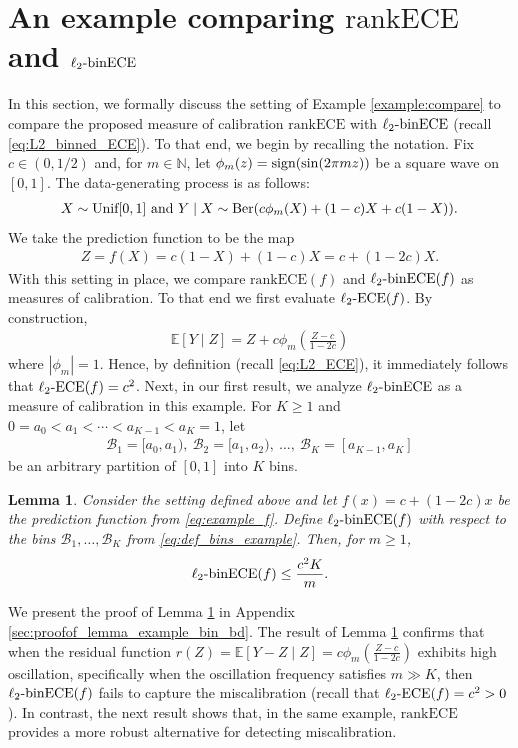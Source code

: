 \documentclass[11pt]{article}
\numberwithin{equation}{section}
\newtheorem{lemma}{Lemma}[section]
\theoremstyle{definition}
\newcommand{\E}{\mathbb{E}}
\newcommand{\N}{\mathbb{N}}
\newcommand{\cB}{\mathcal{B}}
\newcommand{\ECE}{\mathrm{ECE}}
\newcommand{\lECE}{\ell_2\textnormal{-}\ECE}
\newcommand{\binECE}{\mathrm{binECE}}
\newcommand{\lbinECE}{\ell_2\textnormal{-}\binECE}
\newcommand{\rankECE}{\mathrm{rankECE}}
\begin{document}
\section{An example comparing $\rankECE$ and $\lbinECE$}\label{appendix:example}

In this section, we formally discuss the setting of Example \ref{example:compare} to compare the proposed measure of calibration $\rankECE$ with $\lbinECE$ (recall \eqref{eq:L2_binned_ECE}). To that end, we begin by recalling the notation. Fix $c\in (0,1/2)$ and, for $m\in \N$, let $\phi_m(z) = \textnormal{sign}(\sin(2\pi mz))$ be a square wave on $[0,1]$. The data-generating process is as follows:
\begin{align*}
    X\sim \textnormal{Unif}[0,1] \text{ and }Y\mid X\sim \textnormal{Ber}(c\phi_m(X) + (1-c)X + c(1-X)).
\end{align*}
We take the prediction function to be the map
\begin{align}\label{eq:example_f}
    Z = f(X) = c(1-X) + (1-c)X = c + (1-2c)X.
\end{align}
With this setting in place, we compare $\rankECE(f)$ and $\lbinECE(f)$ as measures of calibration. To that end we first evaluate $\lECE(f)$. By construction,
\begin{align*}
    \E[Y\mid Z] = Z + c\phi_m\left(\frac{Z - c}{1-2c}\right)
\end{align*}
where $|\phi_m| = 1$. Hence, by definition (recall \eqref{eq:L2_ECE}), it immediately follows that $\lECE(f) = c^2$. Next, in our first result, we analyze $\lbinECE$ as a measure of calibration in this example. For $K\geq 1$ and $0=a_0<a_1<\cdots<a_{K-1}<a_K=1$, let
\begin{align}\label{eq:def_bins_example}
\cB_1=[a_0,a_1),\ \cB_2=[a_1,a_2),\ \ldots,\ \cB_K=[a_{K-1},a_K]
\end{align}
be an arbitrary partition of $[0,1]$ into $K$ bins.
\begin{lemma}\label{lemma:example_bin_bd}
Consider the setting defined above and let $f(x) = c + (1-2c)x$ be the prediction function from \eqref{eq:example_f}. Define $\lbinECE(f)$ with respect to the bins $\cB_1,\ldots,\cB_K$ from \eqref{eq:def_bins_example}. Then, for $m\geq 1$,
\begin{align*}
\lbinECE(f) \leq \frac{c^2K}{m}.
\end{align*}
\end{lemma}


We present the proof of Lemma \ref{lemma:example_bin_bd} in Appendix \ref{sec:proofof_lemma_example_bin_bd}. The result of Lemma \ref{lemma:example_bin_bd} confirms that when the residual function $r(Z) = \E[Y-Z\mid Z] = c\phi_m\left(\frac{Z - c}{1-2c}\right)$ exhibits high oscillation, specifically when the oscillation frequency satisfies $m\gg K$, then $\lbinECE(f)$ fails to capture the miscalibration (recall that $\lECE(f) = c^2>0$). In contrast, the next result shows that, in the same example, $\rankECE$ provides a more robust alternative for detecting miscalibration.
\end{document}
